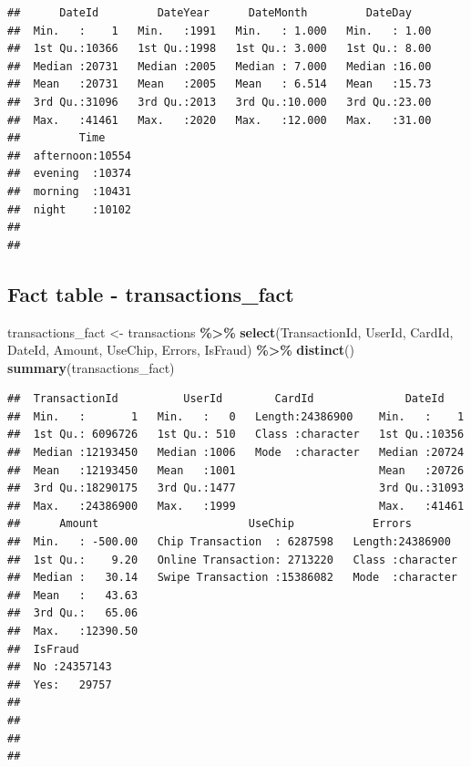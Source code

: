\documentclass[
]{article}
\newenvironment{Shaded}{\begin{snugshade}}{\end{snugshade}}
\newcommand{\FunctionTok}[1]{\textcolor[rgb]{0.13,0.29,0.53}{\textbf{#1}}}
\newcommand{\NormalTok}[1]{#1}
\newcommand{\OtherTok}[1]{\textcolor[rgb]{0.56,0.35,0.01}{#1}}
\newcommand{\SpecialCharTok}[1]{\textcolor[rgb]{0.81,0.36,0.00}{\textbf{#1}}}
\begin{document}
\begin{verbatim}
##      DateId         DateYear      DateMonth         DateDay     
##  Min.   :    1   Min.   :1991   Min.   : 1.000   Min.   : 1.00  
##  1st Qu.:10366   1st Qu.:1998   1st Qu.: 3.000   1st Qu.: 8.00  
##  Median :20731   Median :2005   Median : 7.000   Median :16.00  
##  Mean   :20731   Mean   :2005   Mean   : 6.514   Mean   :15.73  
##  3rd Qu.:31096   3rd Qu.:2013   3rd Qu.:10.000   3rd Qu.:23.00  
##  Max.   :41461   Max.   :2020   Max.   :12.000   Max.   :31.00  
##         Time      
##  afternoon:10554  
##  evening  :10374  
##  morning  :10431  
##  night    :10102  
##                   
## 
\end{verbatim}

\subsection{Fact table -
transactions\_fact}\label{fact-table---transactions_fact}

\begin{Shaded}
\begin{Highlighting}[]
\NormalTok{transactions\_fact }\OtherTok{\textless{}{-}}\NormalTok{ transactions }\SpecialCharTok{\%\textgreater{}\%} \FunctionTok{select}\NormalTok{(TransactionId, UserId, CardId, }
\NormalTok{                                             DateId, Amount, UseChip, Errors, }
\NormalTok{                                             IsFraud) }\SpecialCharTok{\%\textgreater{}\%} \FunctionTok{distinct}\NormalTok{()}
\FunctionTok{summary}\NormalTok{(transactions\_fact)}
\end{Highlighting}
\end{Shaded}

\begin{verbatim}
##  TransactionId          UserId        CardId              DateId     
##  Min.   :       1   Min.   :   0   Length:24386900    Min.   :    1  
##  1st Qu.: 6096726   1st Qu.: 510   Class :character   1st Qu.:10356  
##  Median :12193450   Median :1006   Mode  :character   Median :20724  
##  Mean   :12193450   Mean   :1001                      Mean   :20726  
##  3rd Qu.:18290175   3rd Qu.:1477                      3rd Qu.:31093  
##  Max.   :24386900   Max.   :1999                      Max.   :41461  
##      Amount                       UseChip            Errors         
##  Min.   : -500.00   Chip Transaction  : 6287598   Length:24386900   
##  1st Qu.:    9.20   Online Transaction: 2713220   Class :character  
##  Median :   30.14   Swipe Transaction :15386082   Mode  :character  
##  Mean   :   43.63                                                   
##  3rd Qu.:   65.06                                                   
##  Max.   :12390.50                                                   
##  IsFraud       
##  No :24357143  
##  Yes:   29757  
##                
##                
##                
## 
\end{verbatim}
\end{document}
